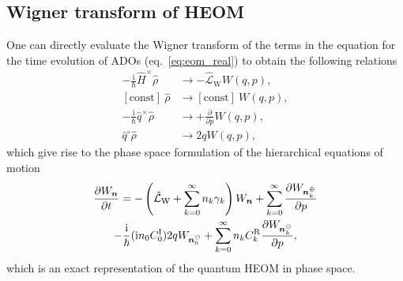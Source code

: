 \subsection{Wigner transform of HEOM}
One can directly evaluate the Wigner transform of the terms in the equation for the time evolution of ADOs (eq.~\ref{eq:eom_real}) to obtain the following relations
\begin{align}
	-\frac{\mathrm{i}}{\hbar} \hat{H}^\times \hat{\rho} &\longrightarrow
	-\hat{\mathcal{L}}_\mathrm{W} W(q,p),\\
	[\mathrm{const}]\ \hat{\rho} &\longrightarrow [\mathrm{const}]\ W(q,p),\\
	-\frac{\mathrm{i}}{\hbar} \hat{q}^\times \hat{\rho} &\longrightarrow
	+\frac{\partial}{\partial p} W(q,p),\\
	\hat{q}^\circ \hat{\rho} &\longrightarrow 2qW(q,p),
\end{align}
which give rise to the phase space formulation of the hierarchical equations of motion
\begin{multline}
	\frac{\partial W_{\bm{n}}}{\partial t}=-\left(\hat{\mathcal{L}}_\mathrm{W} +\sum_{k=0}^{\infty}n_k \gamma_k \right)W_{\bm{n}}
	+ \sum_{k=0}^{\infty} \frac{\partial W_{\bm{n}_k^\oplus}}{\partial p} \\
	-\frac{\mathrm{i}}{\hbar}(\mathrm{i} n_0 C_0^\mathrm{I})2qW_{\bm{n}_0^\ominus}
	+ \sum_{k=0}^{\infty} n_k C_k^\mathrm{R}\frac{\partial W_{\bm{n}_k^\ominus}}{\partial p},
	\label{eq:wigheom}
\end{multline}
which is an exact representation of the quantum HEOM in phase space.
